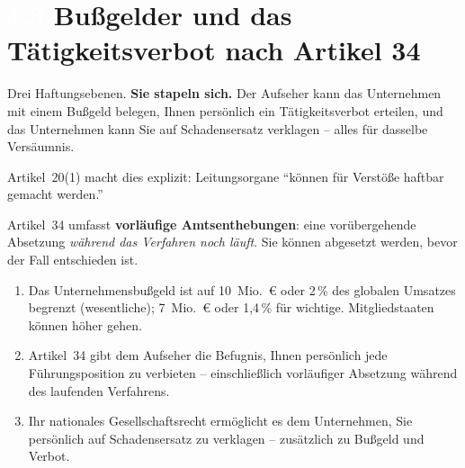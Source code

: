 \documentclass[11pt,a4paper,twoside]{book}
\newcommand{\lessontag}[1]{%
  \texorpdfstring{%
    \setlength{\fboxsep}{3pt}\colorbox{nisd2blue}{\textcolor{white}{\footnotesize\bfseries #1}}\quad%
  }{Lektion #1\ }%
}
\begin{document}
\section{\lessontag{1.3}Bußgelder und das Tätigkeitsverbot nach Artikel 34}

\begin{center}
\end{center}

Drei Haftungsebenen. \textbf{Sie stapeln sich.} Der Aufseher kann das Unternehmen mit einem Bußgeld belegen, Ihnen persönlich ein Tätigkeitsverbot erteilen, und das Unternehmen kann Sie auf Schadensersatz verklagen -- alles für dasselbe Versäumnis.

Artikel~20(1) macht dies explizit: Leitungsorgane ``können für Verstöße haftbar gemacht werden.''

\begin{warningbox}
Artikel~34 umfasst \textbf{vorläufige Amtsenthebungen}: eine vorübergehende Absetzung \emph{während das Verfahren noch läuft}. Sie können abgesetzt werden, bevor der Fall entschieden ist.
\end{warningbox}

\begin{keytakeaways}
\begin{enumerate}
  \item Das Unternehmensbußgeld ist auf 10~Mio.~\euro{} oder 2\,\% des globalen Umsatzes begrenzt (wesentliche); 7~Mio.~\euro{} oder 1,4\,\% für wichtige. Mitgliedstaaten können höher gehen.
  \item Artikel~34 gibt dem Aufseher die Befugnis, Ihnen persönlich jede Führungsposition zu verbieten -- einschließlich vorläufiger Absetzung während des laufenden Verfahrens.
  \item Ihr nationales Gesellschaftsrecht ermöglicht es dem Unternehmen, Sie persönlich auf Schadensersatz zu verklagen -- zusätzlich zu Bußgeld und Verbot.
\end{enumerate}
\end{keytakeaways}
\end{document}

